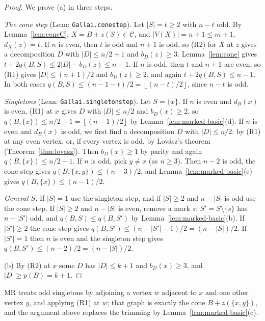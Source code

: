 \documentclass[11pt]{amsart}
\theoremstyle{definition}
\theoremstyle{remark}
\renewcommand{\_}{\oldunderscore\allowbreak}
\newcommand{\lean}[1]{\textup{(Lean: {\small\texttt{#1}})}}
\newcommand{\cC}{\mathcal{C}}
\newcommand{\fl}[1]{\left\lfloor #1\right\rfloor}
\begin{document}
\begin{proof}
We prove (a) in three steps.

\emph{The cone step} \lean{Gallai.cone\_step}. Let $|S|=t\ge2$ with $n-t$ odd. By
Lemma~\ref{lem:coneC}, $X=B+z(S)\in\cC$, and $|V(X)|=n+1\le m+1$, $d_X(z)=t$. If $n$ is even, then
$t$ is odd and $n+1$ is odd, so (R2) for $X$ at $z$ gives a decomposition $D$ with
$|D|\le n/2+1$ and $b_D(z)\ge3$. Lemma~\ref{lem:cone} gives $t+2q(B,S)\le 2|D|-b_D(z)\le n-1$. If
$n$ is odd, then $t$ and $n+1$ are even, so (R1) gives $|D|\le(n+1)/2$ and $b_D(z)\ge2$, and again
$t+2q(B,S)\le n-1$. In both cases $q(B,S)\le(n-1-t)/2=\fl{(n-t)/2}$, since $n-t$ is odd.

\emph{Singletons} \lean{Gallai.singleton\_step}. Let $S=\{x\}$. If $n$ is even and $d_B(x)$ is
even, (R1) at $x$ gives $D$ with $|D|\le n/2$ and $b_D(x)\ge2$, so
$q(B,\{x\})\le n/2-1=\fl{(n-1)/2}$ by Lemma~\ref{lem:marked-basic}(d). If $n$ is even and $d_B(x)$ is
odd, we first find a decomposition $D$ with $|D|\le n/2$: by (R1) at any even vertex, or, if every
vertex is odd, by Lov\'asz's theorem (Theorem~\ref{thm:lovasz}). Then $b_D(x)\ge1$ by parity and
again $q(B,\{x\})\le n/2-1$. If $n$ is odd, pick $y\ne x$ (as $n\ge3$). Then $n-2$ is odd, the cone
step gives $q(B,\{x,y\})\le(n-3)/2$, and Lemma~\ref{lem:marked-basic}(c) gives
$q(B,\{x\})\le(n-1)/2$.

\emph{General $S$.} If $|S|=1$ use the singleton step, and if $|S|\ge2$ and $n-|S|$ is odd use the
cone step. If $|S|\ge2$ and $n-|S|$ is even, remove a mark $s$: $S'=S\setminus\{s\}$ has
$n-|S'|$ odd, and $q(B,S)\le q(B,S')$ by Lemma~\ref{lem:marked-basic}(b). If $|S'|\ge2$ the cone
step gives $q(B,S')\le(n-|S'|-1)/2=(n-|S|)/2$. If $|S'|=1$ then $n$ is even and the singleton step
gives $q(B,S')\le(n-2)/2=(n-|S|)/2$.

(b) By (R2) at $x$ some $D$ has $|D|\le k+1$ and $b_D(x)\ge3$, and $|D|\ge p(B)=k+1$.
\end{proof}

MR treats odd singletons by adjoining a vertex $w$ adjacent to $x$ and one other vertex $y$, and
applying (R1) at $w$; that graph is exactly the cone $B+z(\{x,y\})$, and the argument above replaces
the trimming by Lemma~\ref{lem:marked-basic}(c).
\end{document}
